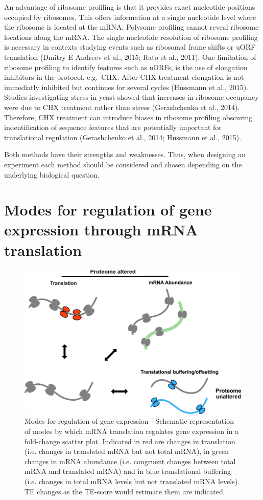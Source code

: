 \documentclass[12pt,openany]{book}
\begin{document}
An advantage of ribosome profiling is that it provides exact nucleotide
positions occupied by ribosomes. This offers information at a single
nucleotide level where the ribosome is located at the mRNA. Polysome
profiling cannot reveal ribosome locations along the mRNA. The single
nucleotide resolution of ribosome profiling is necessary in contexts
studying events such as ribosomal frame shifts or uORF translation
(Dmitry E Andreev et al., 2015; Rato et al., 2011). One limitation of
ribosome profiling to identify features such as uORFs, is the use of
elongation inhibitors in the protocol, e.g.~CHX. After CHX treatment
elongation is not immediatly inhibited but continues for several cycles
(Hussmann et al., 2015). Studies investigating stress in yeast showed
that increases in ribosome occupancy were due to CHX treatment rather
than stress (Gerashchenko et al., 2014). Therefore, CHX treatment can
introduce biases in ribosome profiling obscuring indentification of
sequence features that are potentially important for translational
regulation (Gerashchenko et al., 2014; Hussmann et al., 2015).

Both methods have their strengths and weaknesses. Thus, when designing
an experiment each method should be considered and chosen depending on
the underlying biological question. \newline
\section{Modes for regulation of gene expression through mRNA translation} \label{modes}

\begin{figure}
  \includegraphics{./figures/geneModes_MRNA.pdf}
  \caption{Modes for regulation of gene expression - Schematic representation of modes by which mRNA translation regulates gene expression in a fold-change scatter plot. Indicated in red are changes in translation (i.e. changes in translated mRNA but not total mRNA), in green changes in mRNA abundance (i.e. congruent changes between total mRNA and translated mRNA) and in blue translational buffering (i.e. changes in total mRNA levels but not translated mRNA levels). TE changes as the TE-score would estimate them are indicated.\label{fig:modes}}
\end{figure}
\end{document}
